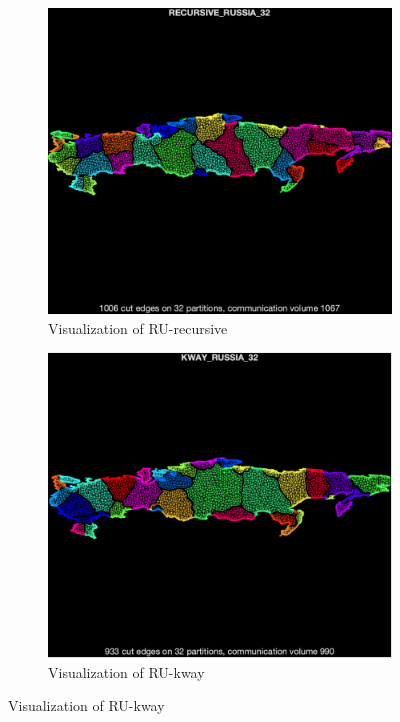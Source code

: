 \documentclass[unicode,11pt,a4paper,oneside,numbers=endperiod,openany]{scrartcl}
\begin{document}
\begin{figure}[htbp]
    \centering
    
    \begin{subfigure}[b]{0.4\textwidth}
        \includegraphics[width=\textwidth]{images/ru-recu.png}
        \caption{Visualization of RU-recursive}
    \end{subfigure}
    \hfill
    \begin{subfigure}[b]{0.4\textwidth}
        \includegraphics[width=\textwidth]{images/ru-kway.png}
        \caption{Visualization of RU-kway} 
    \end{subfigure}
    
\end{figure}
\end{document}
